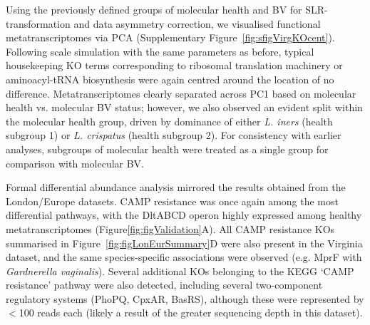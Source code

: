 \documentclass[sn-mathphys,Numbered]{sn-jnl}%
\begin{document}
Using the previously defined groups of molecular health and BV for SLR-transformation and data asymmetry correction, we visualised functional metatranscriptomes via PCA (Supplementary Figure~\ref{fig:sfigVirgKOcent}). Following scale simulation with the same parameters as before, typical housekeeping KO terms corresponding to ribosomal translation machinery or aminoacyl-tRNA biosynthesis were again centred around the location of no difference. Metatranscriptomes clearly separated across PC1 based on molecular health vs. molecular BV status; however, we also observed an evident split within the molecular health group, driven by dominance of either \textit{L. iners} (health subgroup 1) or \textit{L. crispatus} (health subgroup 2). For consistency with earlier analyses, subgroups of molecular health were treated as a single group for comparison with molecular BV.

Formal differential abundance analysis mirrored the results obtained from the London/Europe datasets. CAMP resistance was once again among the most differential pathways, with the DltABCD operon highly expressed among healthy metatranscriptomes (Figure\ref{fig:figValidation}A). All CAMP resistance KOs summarised in Figure~\ref{fig:figLonEurSummary}D were also present in the Virginia dataset, and the same species-specific associations were observed (e.g. MprF with \textit{Gardnerella vaginalis}). Several additional KOs belonging to the KEGG `CAMP resistance' pathway were also detected, including several two-component regulatory systems (PhoPQ, CpxAR, BasRS), although these were represented by $<$100 reads each (likely a result of the greater sequencing depth in this dataset).
\end{document}
